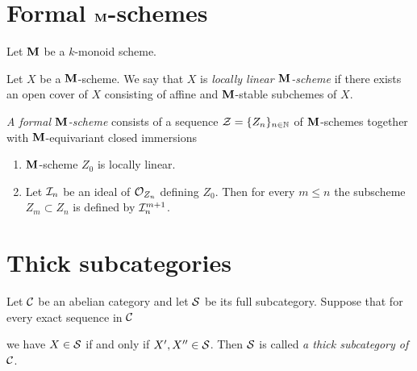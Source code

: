 \section{Formal $\mathbf{M}$-schemes}
\noindent
Let $\mathbf{M}$ be a $k$-monoid scheme.

\begin{definition}
Let $X$ be a $\mathbf{M}$-scheme. We say that $X$ is \textit{locally linear $\mathbf{M}$-scheme} if there exists an open cover of $X$ consisting of affine and $\mathbf{M}$-stable subchemes of $X$.
\end{definition}

\begin{definition}
\textit{A formal $\mathbf{M}$-scheme} consists of a sequence ${\mathcal Z} = \{Z_n\}_{n\in {\mathbb N}}$ of $\mathbf{M}$-schemes together with $\mathbf{M}$-equivariant closed immersions
\begin{center}
\end{center}
\begin{enumerate}[label=\textbf{(\arabic*)}, leftmargin=1.5em]
\item $\mathbf{M}$-scheme $Z_0$ is locally linear.
\item Let ${\mathcal I}_n$ be an ideal of ${\mathcal O}_{Z_n}$ defining $Z_0$. Then for every $m\leq n$ the subscheme $Z_m \subset Z_n$ is defined by ${\mathcal I}_n^{m+1}$.
\end{enumerate}
\end{definition}

\section{Thick subcategories}

\begin{definition}
Let ${\mathcal C}$ be an abelian category and let ${\mathcal S}$ be its full subcategory. Suppose that for every exact sequence in ${\mathcal C}$
\begin{center}
\end{center}
we have $X\in {\mathcal S}$ if and only if $X',X''\in {\mathcal S}$. Then ${\mathcal S}$ is called \textit{a thick subcategory of ${\mathcal C}$}.
\end{definition}

